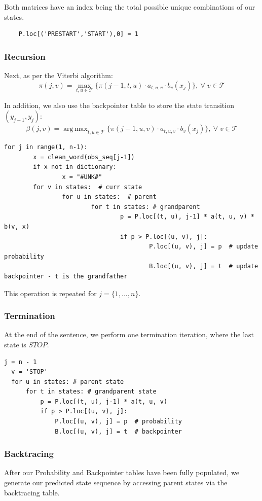 \documentclass{article}
\DeclareMathOperator*{\argmax}{arg\,max}
\numberwithin{equation}{section}
\begin{document}
Both matrices have an index being the total possible unique combinations of our states.

\begin{verbatim}
	P.loc[('PRESTART','START'),0] = 1
\end{verbatim}

\subsubsection{Recursion}
Next, as per the Viterbi algorithm:
	$$ \pi(j, v) = \max_{t, u\in\mathcal{T}} \{ \pi(j-1, t, u) \cdot a_{t, u, v} \cdot b_v(x_j) \}, \: \forall\; v \in \mathcal{T} $$

In addition, we also use the backpointer table to store the state transition $(y_{j-1}, y_j)$:
	$$\beta(j, v) = \argmax_{t, u\in\mathcal{T}} \{ \pi(j-1, u, v) \cdot a_{t, u, v} \cdot b_v(x_j) \}, \: \forall\; v \in \mathcal{T} $$

\begin{verbatim}
for j in range(1, n-1):
		x = clean_word(obs_seq[j-1])
		if x not in dictionary:
				x = "#UNK#"
		for v in states:  # curr state
				for u in states:  # parent
						for t in states: # grandparent
								p = P.loc[(t, u), j-1] * a(t, u, v) * b(v, x)
								if p > P.loc[(u, v), j]:
										P.loc[(u, v), j] = p  # update probability
										B.loc[(u, v), j] = t  # update backpointer - t is the grandfather
\end{verbatim}

This operation is repeated for $j = \{1, ..., n\}$.

\subsubsection{Termination}
At the end of the sentence, we perform one termination iteration, where the last state is $STOP$.

\begin{verbatim}
j = n - 1
  v = 'STOP'
  for u in states: # parent state
      for t in states: # grandparent state
          p = P.loc[(t, u), j-1] * a(t, u, v)
          if p > P.loc[(u, v), j]:
              P.loc[(u, v), j] = p  # probability
              B.loc[(u, v), j] = t  # backpointer
\end{verbatim}

\subsubsection{Backtracing}
After our Probability and Backpointer tables have been fully populated, we generate our predicted state sequence by accessing parent states via the backtracing table.
\end{document}
